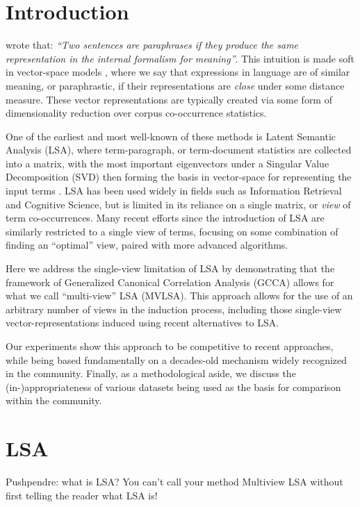 \section{Introduction}

 wrote that: \emph{``Two sentences
  are paraphrases if they produce the same representation in the
  internal formalism for meaning''}.  This intuition is made soft in
vector-space models \cite{turney2010frequency}, where we say that
expressions in language are of similar meaning, or paraphrastic, if
their representations are \emph{close} under some distance measure.
These vector representations are typically created via some form of
dimensionality reduction over corpus co-occurrence statistics.

One of the earliest and most well-known of these methods is Latent
Semantic Analysis (LSA), where term-paragraph, or term-document
statistics are collected into a matrix, with the most important
eigenvectors under a Singular Value Decomposition (SVD) then forming
the basis in vector-space for representing the input terms
\cite{landauer1997solution}.  LSA has been used widely in fields such
as Information Retrieval and Cognitive Science, but is limited in its
reliance on a single matrix, or \emph{view} of term co-occurrences.
Many recent efforts since the introduction of LSA are similarly
restricted to a single view of terms, focusing on some combination of
finding an ``optimal'' view, paired with more advanced algorithms.

Here we address the single-view limitation of LSA by demonstrating
that the framework of Generalized Canonical Correlation Analysis
(GCCA) allows for what we call ``multi-view'' LSA (MVLSA).  This
approach allows for the use of an arbitrary number of views in the
induction process, including those single-view vector-representations
induced using recent alternatives to LSA.

Our experiments show this approach to be competitive to recent
approaches, while being based fundamentally on a decades-old mechanism
widely recognized in the community.  Finally, as a methodological
aside, we discuss the (in-)appropriateness of various datasets being
used as the basis for comparison within the community.


\section{LSA}

Pushpendre: what is LSA?  You can't call your method Multiview LSA
without first telling the reader what LSA is!
